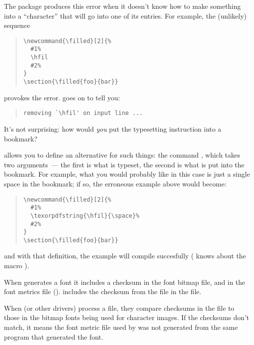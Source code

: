 {

The package  produces this error when it doesn't
know how to make something into a ``character'' that will go into one
of its  entries.  For example, the (unlikely) sequence
\begin{quote}
\begin{verbatim}
\newcommand{\filled}[2]{%
  #1%
  \hfil
  #2%
}
\section{\filled{foo}{bar}}
\end{verbatim}
\end{quote}
provokes the error.   goes on to tell you:
\begin{quote}
\begin{verbatim}
removing `\hfil' on input line ...
\end{verbatim}
\end{quote}
It's not surprising: how would \emph{you} put the
typesetting instruction  into a  bookmark?

 allows you to define an alternative for such
things: the command , which takes two
arguments~--- the first is what is typeset, the second is what is put
into the bookmark.  For example, what you would probably like in this
case is just a single space in the bookmark; if so, the erroneous
example above would become:
\begin{quote}
\begin{verbatim}
\newcommand{\filled}[2]{%
  #1%
  \texorpdfstring{\hfil}{\space}%
  #2%
}
\section{\filled{foo}{bar}}
\end{verbatim}
\end{quote}
and with that definition, the example will compile succesfully
( knows about the macro ).


When \MF{} generates a font it includes a checksum in the font bitmap
file, and in the font metrics file ().  \AllTeX{} includes
the checksum from the  file in the  file.

When  (or other  drivers) process a
 file, they compare checksums in the  file to
those in the bitmap fonts being used for character images.  If the
checksums don't match, it means the font metric file used by \AllTeX{}
was not generated from the same \MF{} program that generated the
font.

}
